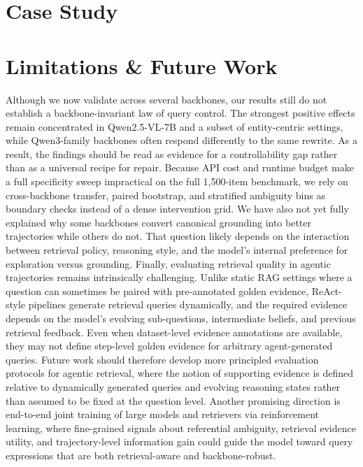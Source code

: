 \documentclass{article} %
\begin{document}
\section{Case Study}

\section{Limitations \& Future Work}
Although we now validate across several backbones, our results still do not establish a backbone-invariant law of query control.
The strongest positive effects remain concentrated in Qwen2.5-VL-7B and a subset of entity-centric settings, while Qwen3-family backbones often respond differently to the same rewrite.
As a result, the findings should be read as evidence for a controllability gap rather than as a universal recipe for repair.
Because API cost and runtime budget make a full specificity sweep impractical on the full 1,500-item benchmark, we rely on cross-backbone transfer, paired bootstrap, and stratified ambiguity bins as boundary checks instead of a dense intervention grid.
We have also not yet fully explained why some backbones convert canonical grounding into better trajectories while others do not.
That question likely depends on the interaction between retrieval policy, reasoning style, and the model's internal preference for exploration versus grounding.
Finally, evaluating retrieval quality in agentic trajectories remains intrinsically challenging.
Unlike static RAG settings where a question can sometimes be paired with pre-annotated golden evidence, ReAct-style pipelines generate retrieval queries dynamically, and the required evidence depends on the model's evolving sub-questions, intermediate beliefs, and previous retrieval feedback.
Even when dataset-level evidence annotations are available, they may not define step-level golden evidence for arbitrary agent-generated queries.
Future work should therefore develop more principled evaluation protocols for agentic retrieval, where the notion of supporting evidence is defined relative to dynamically generated queries and evolving reasoning states rather than assumed to be fixed at the question level.
Another promising direction is end-to-end joint training of large models and retrievers via reinforcement learning, where fine-grained signals about referential ambiguity, retrieval evidence utility, and trajectory-level information gain could guide the model toward query expressions that are both retrieval-aware and backbone-robust.
\end{document}
